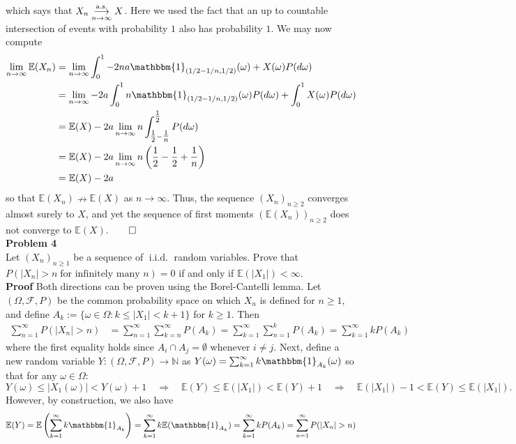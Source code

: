 \documentclass[10pt]{article}
\newcommand{\E}{\mathbb{E}}
\newcommand{\bp}[1]{\left({#1}\right)}
\newcommand{\mbb}[1]{\mathbb{#1}}
\newcommand{\1}[1]{\mathbbm{1}_{#1}}
\newcommand{\mc}[1]{\mathcal{#1}}
\DeclareMathOperator{\as}{a.s.}
\DeclareMathOperator{\iid}{i.i.d.}
\begin{document}
    which says that $X_n\overunderset{\as}{n\rightarrow\infty}{\longrightarrow} X$. Here we used the fact that an up to countable intersection of events with probability $1$ also has probability $1$. We may now compute
    \begin{align*}
        \lim_{n\rightarrow\infty}\E(X_n)&=\lim_{n\rightarrow\infty}\int_0^1-2na\1{(1/2-1/n,1/2)}(\omega)+X(\omega)P(d\omega)\\
        &=\lim_{n\rightarrow\infty}-2a\int_{0}^1n\1{(1/2-1/n,1/2)}(\omega)P(d\omega)+\int_0^1X(\omega)P(d\omega)\\
        &=\E(X)-2a\lim_{n\rightarrow\infty}n\int_{\tfrac{1}{2}-\tfrac{1}{n}}^{\tfrac{1}{2}}P(d\omega)\\
        &=\E(X)-2a\lim_{n\rightarrow\infty}n\bp{\frac{1}{2}-\frac{1}{2}+\frac{1}{n}}\\
        &=\E(X)-2a
    \end{align*}
    so that $\E(X_n)\nrightarrow\E(X)$ as $n\rightarrow\infty$. Thus, the sequence $(X_n)_{n\geq 2}$ converges almost surely to $X$, and yet the sequence of first moments $(\E(X_n))_{n\geq 2}$ does not converge to $\E(X)$.\hfill{$\qed$}\\[5pt]
    {\bf Problem 4}\\[5pt]
    Let $(X_n)_{n\geq 1}$ be a sequence of $\iid$ random variables. Prove that $P(|X_n|>n\;\text{for infinitely many $n$})=0$ if and only if $\E(|X_1|)<\infty$.\\[5pt]
    {\bf Proof}\hspace{5pt} Both directions can be proven using the Borel-Cantelli lemma. Let $(\Omega,\mc{F},P)$ be the common probability space on which $X_n$ is defined for $n\geq 1$, and define $A_k:=\{\omega\in\Omega:k\leq |X_1|<k+1\}$ for $k\geq 1$. Then
    \begin{align*}
        \sum_{n=1}^\infty P(|X_n|>n)&=\sum_{n=1}^\infty \sum_{k=n}^\infty P(A_k)=\sum_{k=1}^\infty\sum_{n=1}^kP(A_k)=\sum_{k=1}^\infty kP(A_k)
    \end{align*}
    where the first equality holds since $A_i\cap A_j=\emptyset$ whenever $i\neq j$. Next, define a new random variable $Y:(\Omega,\mc{F},P)\rightarrow\mbb{N}$ as $Y(\omega)=\sum_{k=1}^\infty k\1{A_k}(\omega)$ so that for any $\omega\in\Omega$:
    \[Y(\omega)\leq |X_1(\omega)|<Y(\omega)+1\quad\Rightarrow\quad \E(Y)\leq \E(|X_1|)<\E(Y)+1\quad\Rightarrow\quad \E(|X_1|)-1 <\E(Y)\leq \E(|X_1|).\]
    However, by construction, we also have
    \[\E(Y)=\E\bp{\sum_{k=1}^\infty k\1{A_k}}=\sum_{k=1}^\infty k\E(\1{A_k})=\sum_{k=1}^\infty kP(A_k)=\sum_{n=1}^\infty P(|X_n|>n)\]
\end{document}
